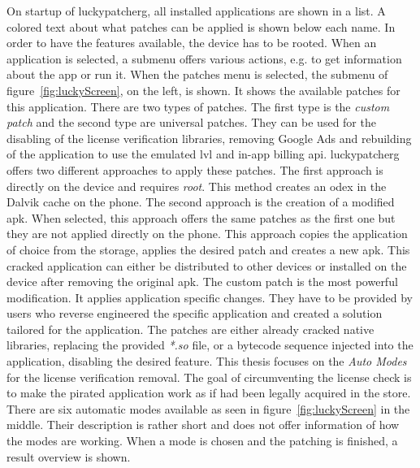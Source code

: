 On startup of \gls{luckypatcherg}, all installed applications are shown in a list.
A colored text about what patches can be applied is shown below each name.
In order to have the features available, the device has to be rooted.
When an application is selected, a submenu offers various actions, e.g. to get information about the app or run it.
\newline
\newline
When the patches menu is selected, the submenu of figure~\ref{fig:luckyScreen}, on the left, is shown.
It shows the available patches for this application.
There are two types of patches.
The first type is the \textit{custom patch} and the second type are universal patches.
They can be used for the disabling of the license verification libraries, removing Google Ads and rebuilding of the application to use the emulated \gls{lvl} and in-app billing \gls{api}.
\newline
\gls{luckypatcherg} offers two different approaches to apply these patches.
The first approach is directly on the device and requires \textit{root}.
This method creates an \gls{odex} in the Dalvik cache on the phone.
The second approach is the creation of a modified \gls{apk}.
When selected, this approach offers the same patches as the first one but they are not applied directly on the phone.
This approach copies the application of choice from the storage, applies the desired patch and creates a new \gls{apk}.
This cracked application can either be distributed to other devices or installed on the device after removing the original \gls{apk}.
\newline
The custom patch is the most powerful modification.
It applies application specific changes.
They have to be provided by users who reverse engineered the specific application and created a solution tailored for the application.
The patches are either already cracked native libraries, replacing the provided \textit{*.so} file, or a bytecode sequence injected into the application, disabling the desired feature.
\newline
This thesis focuses on the \textit{Auto Modes} for the license verification removal.
The goal of circumventing the license check is to make the pirated application work as if had been legally acquired in the store.
There are six automatic modes available as seen in figure~\ref{fig:luckyScreen} in the middle.
Their description is rather short and does not offer information of how the modes are working.
\newline
When a mode is chosen and the patching is finished, a result overview is shown.
